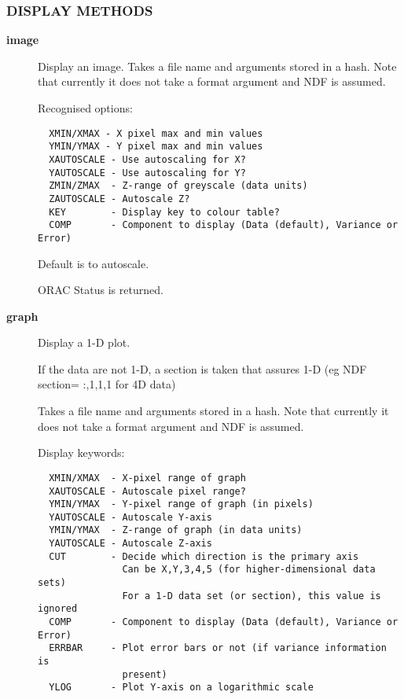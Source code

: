 \subsubsection*{DISPLAY METHODS\label{ORAC::Display::KAPVIEW_DISPLAY_METHODS}}
\begin{description}

\item[{\textbf{image}}] \mbox{}

Display an image.
Takes a file name and arguments stored in a hash.
Note that currently it does not take a format argument
and NDF is assumed.



Recognised options:

\begin{verbatim}
  XMIN/XMAX - X pixel max and min values
  YMIN/YMAX - Y pixel max and min values
  XAUTOSCALE - Use autoscaling for X?
  YAUTOSCALE - Use autoscaling for Y?
  ZMIN/ZMAX  - Z-range of greyscale (data units)
  ZAUTOSCALE - Autoscale Z?
  KEY        - Display key to colour table?
  COMP       - Component to display (Data (default), Variance or Error)
\end{verbatim}


Default is to autoscale.



ORAC Status is returned.


\item[{\textbf{graph}}] \mbox{}

Display a 1-D plot.



If the data are not 1-D, a section is taken that assures
1-D (eg NDF section= :,1,1,1 for 4D data)



Takes a file name and arguments stored in a hash.
Note that currently it does not take a format argument
and NDF is assumed.



Display keywords:

\begin{verbatim}
  XMIN/XMAX  - X-pixel range of graph
  XAUTOSCALE - Autoscale pixel range?
  YMIN/YMAX  - Y-pixel range of graph (in pixels)
  YAUTOSCALE - Autoscale Y-axis
  YMIN/YMAX  - Z-range of graph (in data units)
  YAUTOSCALE - Autoscale Z-axis
  CUT        - Decide which direction is the primary axis
               Can be X,Y,3,4,5 (for higher-dimensional data sets)
               For a 1-D data set (or section), this value is ignored
  COMP       - Component to display (Data (default), Variance or Error)
  ERRBAR     - Plot error bars or not (if variance information is
               present)
  YLOG       - Plot Y-axis on a logarithmic scale
\end{verbatim}



\end{description}
